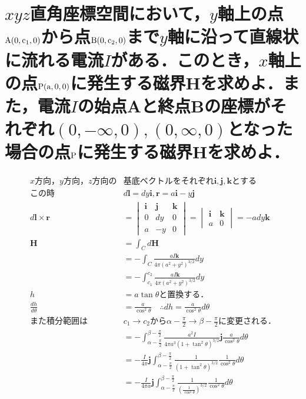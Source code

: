 \documentclass[dvipdfmx]{ujarticle}
\begin{document}
\section{$xyz$直角座標空間において，$y$軸上の点$\rm{A}(0, c_{1}, 0)$から点$\rm{B}(0, c_{2}, 0)$まで$y$軸に沿って直線状に流れる電流$I$がある．このとき，$x$軸上の点$\rm{P}(a, 0, 0)$に発生する磁界$\boldsymbol{H}$を求めよ．また，電流$I$の始点Aと終点Bの座標がそれぞれ$(0, -\infty, 0), (0, \infty, 0)$となった場合の点$\rm{P}$に発生する磁界$\boldsymbol{H}$を求めよ．}
	\begin{align*}
	x方向，y方向，z方向の&基底ベクトルをそれぞれ\boldsymbol{i},\boldsymbol{j},\boldsymbol{k}とする\\
	この時&d\boldsymbol{l}=dy\boldsymbol{i}, \boldsymbol{r}=a\boldsymbol{i}-y\boldsymbol{j}\\
	d\boldsymbol{l}\times \boldsymbol{r}&=
	\begin{vmatrix}
	\boldsymbol{i} & \boldsymbol{j} & \boldsymbol{k}\\
	0 &dy & 0\\
	a & -y &0
	\end{vmatrix}
	=
	\begin{vmatrix}
	\boldsymbol{i}  & \boldsymbol{k}\\
	a & 0
	\end{vmatrix}
	=-ady\boldsymbol{k}\\
	\boldsymbol{H}&=\int_{C} d\boldsymbol{H}\\
	&=-\int_{C} \frac{aI\boldsymbol{k}}{4\pi(a^{2}+y^{2})^{3/2}}dy\\
	&=-\int_{c_{1}}^{c_{2}} \frac{aI\boldsymbol{k}}{4\pi(a^{2}+y^{2})^{3/2}}dy\\
	h&=a\tan \theta と置換する．\\
	\frac{dh}{d\theta}&=\frac{a}{\cos ^{2}\theta } \quad \therefore dh=\frac{a}{\cos ^{2}\theta }d\theta \\
	また積分範囲は&c_{1}\to c_{2}から\alpha-\frac{\pi}{2} \to \beta -\frac{\pi}{2}に変更される．\\
	&=-\int_{\alpha-\frac{\pi}{2}}^{\beta -\frac{\pi}{2}} \frac{a^{2}I}{4\pi a^{3}(1+\tan^{2}\theta)^{3/2}}\boldsymbol{j} \frac{a}{\cos ^{2}\theta }d\theta\\
	&=-\frac{I}{4\pi} \boldsymbol{j} \int_{\alpha-\frac{\pi}{2}}^{\beta -\frac{\pi}{2}} \frac{1}{(1+\tan^{2}\theta)^{3/2}} \frac{1}{\cos ^{2}\theta }d\theta\\
	&=-\frac{I}{4\pi a} \boldsymbol{j} \int_{\alpha-\frac{\pi}{2}}^{\beta -\frac{\pi}{2}} \frac{1}{(\frac{1}{\cos^{2} \theta })^{3/2}} \frac{1}{\cos ^{2}\theta }d\theta\\

\end{align*}
\end{document}
